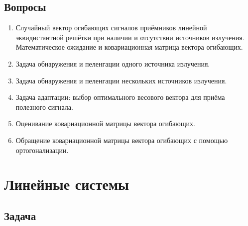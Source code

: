 \documentclass[a4paper,12pt]{article}
\newenvironment{Matlab}{\par \vspace{0.2cm}}{\vspace{0.2cm} \par}
\newcommand{\Mcommand}[1]{\noindent \texttt{> #1} \par}
\newcommand{\matlab}[1]{\begin{Matlab} \Mcommand{#1} \end{Matlab}}
\begin{document}





\subsection{Вопросы}

\begin{enumerate}
    \item Случайный вектор огибающих сигналов приёмников линейной эквидистантной решётки при наличии и отсутствии источников излучения.
        Математическое ожидание и ковариационная матрица вектора огибающих.
    \item Задача обнаружения и пеленгации одного источника излучения.
    \item Задача обнаружения и пеленгации нескольких источников излучения.
    \item Задача адаптации: выбор оптимального весового вектора для приёма полезного сигнала.
    \item Оценивание ковариационной матрицы вектора огибающих.
    \item Обращение ковариационной матрицы вектора огибающих с помощью ортогонализации.
\end{enumerate}

\section{Линейные системы}

\subsection{Задача}
\end{document}
